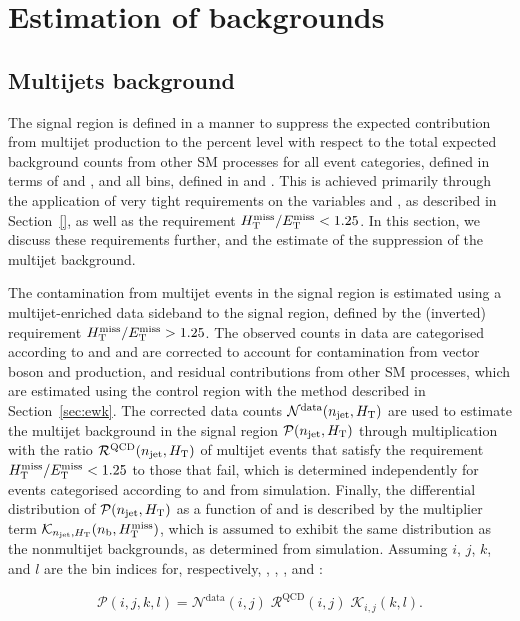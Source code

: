 \section{Estimation of backgrounds}
\label{sec:backgrounds}

\subsection{Multijets background}
\label{sec:qcd_background}

The signal region is defined in a manner to suppress the expected
contribution from multijet production to the percent level with
respect to the total expected background counts from other SM
processes for all event categories, defined in terms of \njet and \nb,
and all bins, defined in \scalht and \HTmiss. This is achieved
primarily through the application of very tight requirements on the
variables \alphat and \dphi, as described in Section~\ref{}, as well
as the requirement $H_{\mathrm{T}}^{\text{miss}} / E_{\mathrm{T}}^{\text{miss}} < 1.25$. In this section, we discuss these
requirements further, and the estimate of the suppression of the
multijet background.

The contamination from multijet events in the signal region is
estimated using a multijet-enriched data sideband to the signal
region, defined by the (inverted) requirement $H_{\mathrm{T}}^{\text{miss}} / E_{\mathrm{T}}^{\text{miss}} > 1.25$. The
observed counts in data are categorised according to \njet and \scalht
and are corrected to account for contamination from vector boson and
\ttbar production, and residual contributions from other SM processes,
which are estimated using the \mj control region with the method
described in Section~\ref{sec:ewk}.  The corrected data counts
$\mathcal{N}^\text{data}(n_{\text{jet}}, H_{\mathrm{T}})$ are used to estimate the
multijet background in the signal region $\mathcal{P}(n_{\text{jet}}, H_{\mathrm{T}})$
through multiplication with the ratio $\mathcal{R}^\text{QCD}(n_{\text{jet}},
H_{\mathrm{T}})$ of multijet events that satisfy the requirement $H_{\mathrm{T}}^{\text{miss}} / E_{\mathrm{T}}^{\text{miss}} <
1.25$ to those that fail, which is determined independently for events
categorised according to \njet and \scalht from simulation. Finally,
the differential distribution of $\mathcal{P}(n_{\text{jet}}, H_{\mathrm{T}})$ as a
function of \nb and \HTmiss is described by the multiplier term
$\mathcal{K}_{n_{\text{jet}}, H_{\mathrm{T}}}(n_{\text{b}}, H_{\text{T}}^{\text{miss}})$, which is assumed to
exhibit the same distribution as the nonmultijet backgrounds, as
determined from simulation. Assuming $i$, $j$, $k$, and $l$ are the
bin indices for, respectively, \njet, \scalht, \nb, and \HTmiss:

\begin{equation}
  \label{eq:qcd}
  \mathcal{P}( i, j, k, l ) =
  \mathcal{N}^\text{data}( i, j )\;
  \mathcal{R}^\text{QCD}( i, j )\;
  \mathcal{K}_{i,j}( k, l ).
\end{equation}

